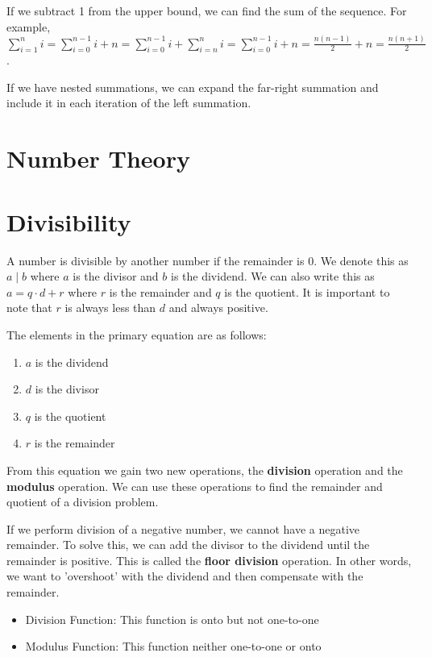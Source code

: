 \documentclass[11pt]{article}
\begin{document}
If we subtract 1 from the upper bound, we can find the sum of the sequence. For example, \(\sum_{i=1}^n i = \sum_{i=0}^{n-1} i + n = \sum_{i=0}^{n-1} i + \sum_{i=n}^n i = \sum_{i=0}^{n-1} i + n = \frac{n(n-1)}{2} + n = \frac{n(n+1)}{2}\).

If we have nested summations, we can expand the far-right summation and include it in each iteration of the left summation.

\section{Number Theory}
\label{sec:org4a36ff2}
\section{Divisibility}
\label{sec:orgbbd958b}
A number is divisible by another number if the remainder is 0. We denote this as \(a \mid b\) where \(a\) is the divisor and \(b\) is the dividend. We can also write this as \(a = q \cdot d + r\) where \(r\) is the remainder and \(q\) is the quotient. It is important to note that \(r\) is always less than \(d\) and always positive.

The elements in the primary equation are as follows:
\begin{enumerate}
\item \(a\) is the dividend
\item \(d\) is the divisor
\item \(q\) is the quotient
\item \(r\) is the remainder
\end{enumerate}

From this equation we gain two new operations, the \textbf{division} operation and the \textbf{modulus} operation. We can use these operations to find the remainder and quotient of a division problem.

If we perform division of a negative number, we cannot have a negative remainder. To solve this, we can add the divisor to the dividend until the remainder is positive. This is called the \textbf{floor division} operation. In other words, we want to 'overshoot' with the dividend and then compensate with the remainder.

\begin{itemize}
\item Division Function: This function is onto but not one-to-one
\item Modulus Function: This function neither one-to-one or onto
\end{itemize}
\end{document}
